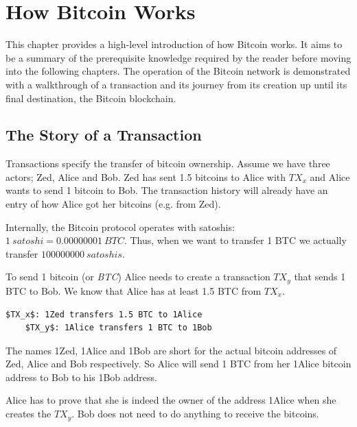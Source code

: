 \chapter{How Bitcoin Works}
\label{ch:howbitcoinworks}

\begin{summary}
This chapter provides a high-level introduction of how Bitcoin works. It aims to be a summary of the prerequisite knowledge required by the reader before moving into the following chapters. The operation of the Bitcoin network is demonstrated with a walkthrough of a transaction and its journey from its creation up until its final destination, the Bitcoin blockchain.
\end{summary}

\section{The Story of a Transaction}
Transactions specify the transfer of bitcoin ownership. Assume we have three actors; Zed, Alice and Bob. Zed has sent 1.5 bitcoins to Alice with $TX_x$ and Alice wants to send 1 bitcoin to Bob. The transaction history will already have an entry of how Alice got her bitcoins (e.g. from Zed).

\begin{note}
Internally, the Bitcoin protocol operates with satoshis: $1~satoshi = 0.00000001~BTC$. Thus, when we want to transfer 1 BTC we actually transfer $100000000~satoshis$.
\end{note}

To send 1 bitcoin (or \emph{BTC}) Alice needs to create a transaction $TX_y$ that sends 1 BTC to Bob. We know that Alice has at least 1.5 BTC from $TX_x$.

\begin{emphbox}
\begin{lstlisting}[style=Pseudomath]
    $TX_x$: 1Zed transfers 1.5 BTC to 1Alice
    $TX_y$: 1Alice transfers 1 BTC to 1Bob
\end{lstlisting}
\end{emphbox}

The names 1Zed, 1Alice and 1Bob are short for the actual bitcoin addresses of Zed, Alice and Bob respectively. So Alice will send 1 BTC from her 1Alice bitcoin address to Bob to his 1Bob address.

Alice has to prove that she is indeed the owner of the address 1Alice when she creates the $TX_y$. Bob does not need to do anything to receive the bitcoins.

